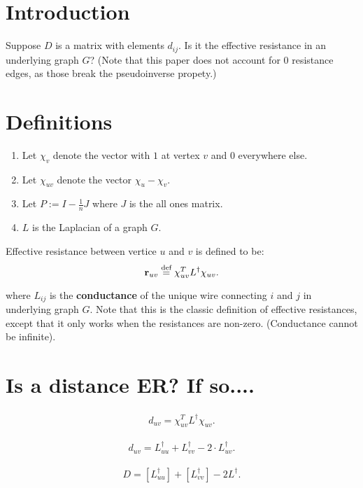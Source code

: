 
\newcommand\ER{\textbf{r}}
\newcommand\Linv{L^{\dag}}
\newcommand\sqrtLinv{L^{\dag/2}}
\newcommand\chiuv{\chi_{uv}}

\section{Introduction}
Suppose $D$ is a matrix with elements $d_{ij}$. Is it the effective resistance in
an underlying graph $G$? (Note that this paper does not account for $0$
    resistance edges, as those break the pseudoinverse propety.)

\section{Definitions}
\begin{enumerate}
\item Let $\chi_v$ denote the vector with $1$ at vertex $v$ and $0$ everywhere
else. 
\item Let $\chi_{uv}$ denote the vector $\chi_u - \chi_v$.
\item Let $P := I - \frac{1}{n}J$ where $J$ is the all ones matrix.
\item $L$ is the Laplacian of a graph $G$.
\end{enumerate}

\begin{definition}
Effective resistance between vertice $u$ and $v$ is defined to be:
$$ \ER_{uv} \defeq \chi_{uv}^T \Linv \chi_{uv}. $$
\end{definition}
where $L_{ij}$ is the \textbf{conductance} of the unique wire connecting $i$
and $j$ in underlying graph $G$. 
Note that this is the classic definition of effective resistances,
except that it only works when the resistances are non-zero.
(Conductance cannot be infinite).

\section{Is a distance ER? If so....}
\begin{align}
d_{uv} = \chiuv^T \Linv \chiuv.
\end{align}

\begin{align}
d_{uv} = \Linv_{uu} + \Linv_{vv} - 2 \cdot \Linv_{uv}.
\end{align}

\begin{align}
D = [\Linv_{uu}] + [\Linv_{vv}] - 2 \Linv.
\end{align}

